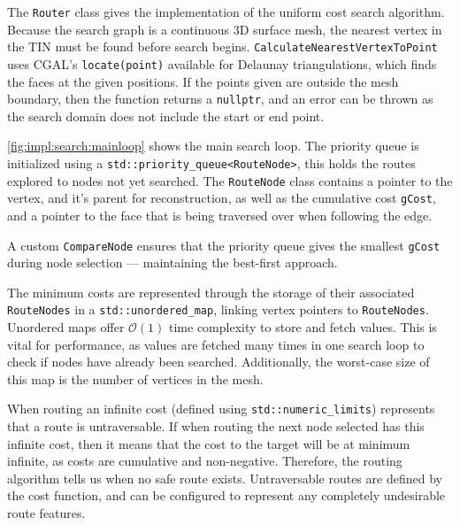 \documentclass[12pt]{article}
\begin{document}
The \texttt{Router} class gives the implementation of the uniform cost search algorithm. Because the search graph is a continuous 3D surface mesh, the nearest vertex in the TIN must be found before search begins. \texttt{CalculateNearestVertexToPoint} uses CGAL's \texttt{locate(point)} available for Delaunay triangulations, which finds the faces at the given positions. If the points given are outside the mesh boundary, then the function returns a \texttt{nullptr}, and an error can be thrown as the search domain does not include the start or end point.

\autoref{fig:impl:search:mainloop} shows the main search loop. The priority queue is initialized using a \texttt{std::priority\_queue<RouteNode>}, this holds the routes explored to nodes not yet searched. The \texttt{RouteNode} class contains a pointer to the vertex, and it's parent for reconstruction, as well as the cumulative cost \texttt{gCost}, and a pointer to the face that is being traversed over when following the edge.

A custom \texttt{CompareNode} ensures that the priority queue gives the smallest \texttt{gCost} during node selection --- maintaining the best-first approach.

The minimum costs are represented through the storage of their associated \texttt{RouteNodes} in a \texttt{std::unordered\_map}, linking vertex pointers to \texttt{RouteNodes}. Unordered maps offer $\mathcal{O} (1)$ time complexity to store and fetch values. This is vital for performance, as values are fetched many times in one search loop to check if nodes have already been searched. Additionally, the worst-case size of this map is the number of vertices in the mesh.

When routing an infinite cost (defined using \texttt{std::numeric\_limits}) represents that a route is untraversable. If when routing the next node selected has this infinite cost, then it means that the cost to the target will be at minimum infinite, as costs are cumulative and non-negative. Therefore, the routing algorithm tells us when no safe route exists. Untraversable routes are defined by the cost function, and can be configured to represent any completely undesirable route features.
\end{document}
